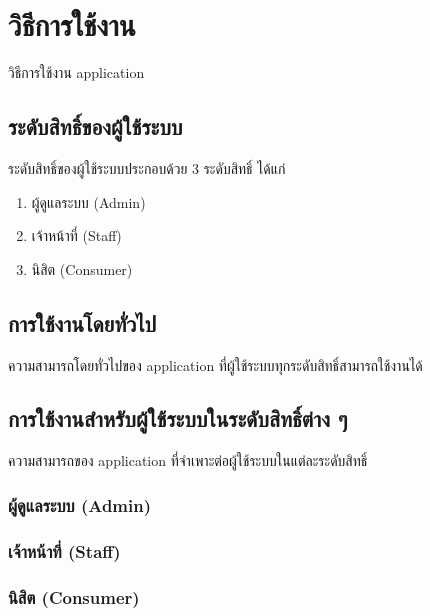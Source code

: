 \section{วิธีการใช้งาน \appName}

วิธีการใช้งาน application

\subsection{ระดับสิทธิ์ของผู้ใช้ระบบ}
ระดับสิทธิ์ของผู้ใช้ระบบประกอบด้วย 3 ระดับสิทธิ์ ได้แก่

\begin{enumerate}
    \item ผู้ดูแลระบบ (Admin)
    \item เจ้าหน้าที่ (Staff)
    \item นิสิต (Consumer)
\end{enumerate}

\subsection{การใช้งานโดยทั่วไป}
ความสามารถโดยทั่วไปของ application ที่ผู้ใช้ระบบทุกระดับสิทธิ์สามารถใช้งานได้

\rule{0em}{1ex}

\noindent\blindtext[3]

\subsection{การใช้งานสำหรับผู้ใช้ระบบในระดับสิทธิ์ต่าง ๆ}
ความสามารถของ application ที่จำเพาะต่อผู้ใช้ระบบในแต่ละระดับสิทธิ์

\subsubsection{ผู้ดูแลระบบ (Admin)}
\noindent\blindtext[3]

\subsubsection{เจ้าหน้าที่ (Staff)}
\noindent\blindtext[3]

\subsubsection{นิสิต (Consumer)}
\noindent\blindtext[3]

